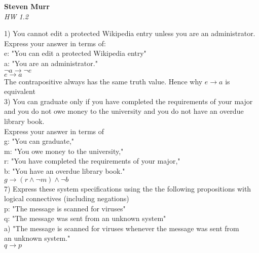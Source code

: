 \documentclass{article}
\begin{document}
   \begin{flushright}
      \Large\textbf{Steven Murr}\\
      \large\textit{HW 1.2}
   \end{flushright}
\begin{flushleft}
\setlength\parindent{0pt}1) You cannot edit a protected Wikipedia entry unless you are an administrator.\\
Express your answer in terms of:\\
\setlength\parindent{24pt}e: "You can edit a protected Wikipedia entry" \\
\setlength\parindent{24pt}a: "You are an administrator."\\
\setlength\parindent{48pt} $\neg a \rightarrow \neg e$ \\
\setlength\parindent{48pt} $e \rightarrow a$ \\
\setlength\parindent{48pt} The contrapositive always has the same truth value.  Hence why 
\setlength\parindent{48pt} $e \rightarrow a$ is equivalent\\
\setlength\parindent{0pt}3) You can graduate only if you have completed the requirements of your major and you do not owe money to the university and you do not have an overdue library book.  \\
Express your answer in terms of\\
\setlength\parindent{24pt}g: "You can graduate," \\
\setlength\parindent{24pt}m: "You owe money to the university," \\
\setlength\parindent{24pt}r: "You have completed the requirements of your major," \\
\setlength\parindent{24pt}b: "You have an overdue library book."\\
\setlength\parindent{48pt} $g \rightarrow (r \land \neg m) \land \neg b$ \\
\setlength\parindent{0pt}7) Express these system specifications using the the following propositions with logical connectives (including negations)\\ 
\setlength\parindent{24pt}p: "The message is scanned for viruses" \\
\setlength\parindent{24pt}q: "The message was sent from an unknown system"\\
\setlength\parindent{48pt}a) "The message is scanned for viruses whenever the message was sent from \\
\setlength\parindent{48pt}an unknown system."\\
\setlength\parindent{55pt}$q \rightarrow p$\\


\end{flushleft}
\end{document}
